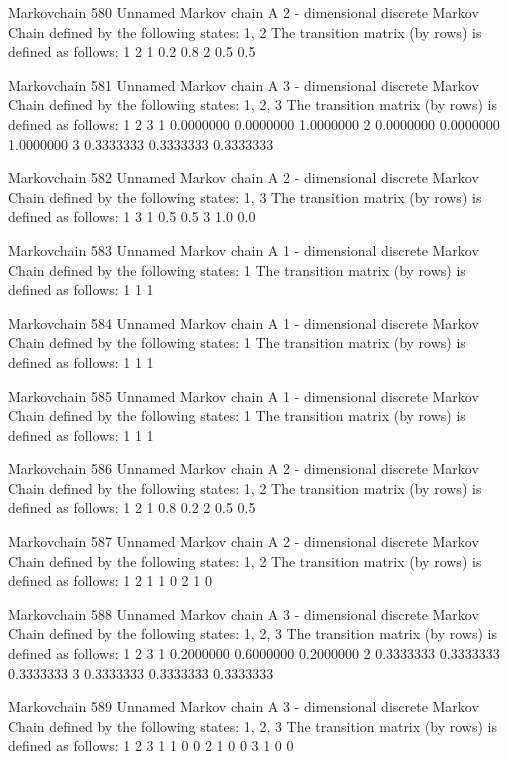 \documentclass[
  nojss]{jss}
\begin{document}
\begin{CodeChunk}
\begin{CodeOutput}
Markovchain  580 
Unnamed Markov chain 
 A  2 - dimensional discrete Markov Chain defined by the following states: 
 1, 2 
 The transition matrix  (by rows)  is defined as follows: 
    1   2
1 0.2 0.8
2 0.5 0.5

Markovchain  581 
Unnamed Markov chain 
 A  3 - dimensional discrete Markov Chain defined by the following states: 
 1, 2, 3 
 The transition matrix  (by rows)  is defined as follows: 
          1         2         3
1 0.0000000 0.0000000 1.0000000
2 0.0000000 0.0000000 1.0000000
3 0.3333333 0.3333333 0.3333333

Markovchain  582 
Unnamed Markov chain 
 A  2 - dimensional discrete Markov Chain defined by the following states: 
 1, 3 
 The transition matrix  (by rows)  is defined as follows: 
    1   3
1 0.5 0.5
3 1.0 0.0

Markovchain  583 
Unnamed Markov chain 
 A  1 - dimensional discrete Markov Chain defined by the following states: 
 1 
 The transition matrix  (by rows)  is defined as follows: 
  1
1 1

Markovchain  584 
Unnamed Markov chain 
 A  1 - dimensional discrete Markov Chain defined by the following states: 
 1 
 The transition matrix  (by rows)  is defined as follows: 
  1
1 1

Markovchain  585 
Unnamed Markov chain 
 A  1 - dimensional discrete Markov Chain defined by the following states: 
 1 
 The transition matrix  (by rows)  is defined as follows: 
  1
1 1

Markovchain  586 
Unnamed Markov chain 
 A  2 - dimensional discrete Markov Chain defined by the following states: 
 1, 2 
 The transition matrix  (by rows)  is defined as follows: 
    1   2
1 0.8 0.2
2 0.5 0.5

Markovchain  587 
Unnamed Markov chain 
 A  2 - dimensional discrete Markov Chain defined by the following states: 
 1, 2 
 The transition matrix  (by rows)  is defined as follows: 
  1 2
1 1 0
2 1 0

Markovchain  588 
Unnamed Markov chain 
 A  3 - dimensional discrete Markov Chain defined by the following states: 
 1, 2, 3 
 The transition matrix  (by rows)  is defined as follows: 
          1         2         3
1 0.2000000 0.6000000 0.2000000
2 0.3333333 0.3333333 0.3333333
3 0.3333333 0.3333333 0.3333333

Markovchain  589 
Unnamed Markov chain 
 A  3 - dimensional discrete Markov Chain defined by the following states: 
 1, 2, 3 
 The transition matrix  (by rows)  is defined as follows: 
  1 2 3
1 1 0 0
2 1 0 0
3 1 0 0


\end{CodeOutput}
\end{CodeChunk}
\end{document}
